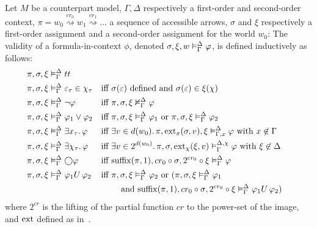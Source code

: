\begin{definition}
Let $M$ be a counterpart model, $\Gamma,\Delta$ respectively a first-order and second-order context, $\pi = w_0
\overset{cr_0}{\rightsquigarrow} w_1 \overset{cr_1}{\rightsquigarrow} \ldots$ a sequence of accessible arrows,
$\sigma$ and $\xi$ respectively a first-order assignment and a second-order assignment for the world $w_0$:
The validity of a formula-in-context $\phi$, denoted ${\sigma}, {\xi}, {w} \vDash_{\Gamma}^{\Delta} {\varphi}$, is defined
inductively as follows:
\begin{align*}
  \pi, \sigma, \xi &\vDash_\Gamma^\Delta tt \\
  \pi, \sigma, \xi &\vDash_\Gamma^\Delta \varepsilon_\tau \in \chi_\tau
      &&\text{iff } \sigma(\varepsilon) \text{ defined and } \sigma(\varepsilon) \in \xi(\chi) \\
  \pi, \sigma, \xi &\vDash_\Gamma^\Delta \neg\varphi
      &&\text{iff } {\pi}, {\sigma}, {\xi} \nvDash_{\Gamma}^{\Delta} {\varphi} \\
  \pi, \sigma, \xi &\vDash_\Gamma^\Delta \varphi_1 \lor \varphi_2
      &&\text{iff } {\pi}, {\sigma}, {\xi} \vDash_{\Gamma}^{\Delta} {\varphi_1} \text{ or }
      {\pi}, {\sigma}, {\xi} \vDash_{\Gamma}^{\Delta} {\varphi_2} \\
  \pi, \sigma, \xi &\vDash_\Gamma^\Delta \exists {x_\tau} \ldotp {\varphi}
      &&\text{iff } \exists {v \in d(w_0)} \ldotp {{\pi}, {\operatorname{ext}_{x}({\sigma},{v})}, {\xi} \vDash_{\Gamma, x}^{\Delta} {\varphi}} \text{ with }
      x \not\in \Gamma \\
  \pi, \sigma, \xi &\vDash_\Gamma^\Delta \exists {\chi_\tau} \ldotp {\varphi}
      &&\text{iff } \exists {v \in 2^{d(w_0)}} \ldotp {{\pi}, {\sigma}, {\operatorname{ext}_{\chi}({\xi},{v})} \vDash_{\Gamma}^{\Delta,\chi} {\varphi}}
        \text{ with } \xi \not\in \Delta \\
  \pi, \sigma, \xi &\vDash_\Gamma^\Delta \bigcirc{\varphi}
      &&\text{iff } {\operatorname{suffix}(\pi,1)}, {cr_0 \circ \sigma}, {2^{cr_0} \circ \xi} \vDash_{\Gamma}^{\Delta} {\varphi} \\
  \pi, \sigma, \xi &\vDash_\Gamma^\Delta {\varphi_1}U\,{\varphi_2}
     &&\text{iff } {\pi}, {\sigma}, {\xi} \vDash_{\Gamma}^{\Delta} {\varphi_2} \text{ or } ({\pi}, {\sigma}, {\xi} \vDash_{\Gamma}^{\Delta} {\varphi_1} \\
         &&&\qquad\text { and } {\operatorname{suffix}(\pi,1)}, {cr_0 \circ \sigma}, {2^{cr_0} \circ \xi} \vDash_{\Gamma}^{\Delta} {{\varphi_1}U\,{\varphi_2}}) \\
\end{align*}
  where $2^{cr}$ is the lifting of the partial function $cr$ to the power-set of the image, and $\operatorname{ext}$ defined as
  in~.
\end{definition}

